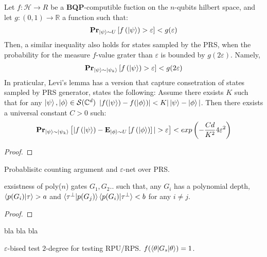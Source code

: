 \documentclass[manuscript,screen,review]{acmart}
\begin{document}
\begin{claim}
  Let $f : \mathcal{H} \rightarrow R$ be a \textbf{BQP}-computible fuction on the $n$-qubits hilbert space, and let $g: (0,1) \rightarrow \mathbb{R} $ a function such that:     
  \begin{equation*}
    \begin{split}
      \prbm{f\left(\ket{\psi} \right) > \varepsilon}{ \ket{\psi} \sim U} < g(\varepsilon)
    \end{split}
  \end{equation*}
  Then, a similar inequality also holds for states sampled by the PRS, when the probability for the measure $f$-value grater than $\varepsilon$ is bounded by $g(2\varepsilon)$. Namely,  
\begin{equation*}
    \begin{split}
      \prbm{f\left(\ket{\psi} \right) > \varepsilon}{ \ket{\psi} \sim \ket{\psi_{k}} } < g(2\varepsilon)
    \end{split}
  \end{equation*}
  In praticular, Levi's lemma has a version that capture consetration of states sampled by PRS generator, states the following: Assume there exsists $K$ such that for any $\ket{\psi},\ket{\phi} \in \mathcal{S}(\mathbb{C}^{d})$ $|f(\ket{\psi}) - f(\ket{\phi})| < K | \ket{\psi} - \ket{\phi}|$. Then there exsists a universal constant $C > 0$ such: 
\begin{equation*}
    \begin{split}
      \prbm{ |f\left(\ket{\psi} \right) - \exppm{f\left(\ket{\phi}\right)}{\ket{\phi} \sim U}| > \varepsilon}{ \ket{\psi} \sim \ket{\psi_{k}} } < exp\left(-\frac{Cd}{K^{2}}  4\varepsilon^{2} \right)
    \end{split}
  \end{equation*}
\end{claim}

\begin{proof}
  
\end{proof}

\begin{claim}
  Probablisitc counting argument and $\varepsilon$-net over PRS. 
\end{claim}

\begin{claim}
  exsistness of poly($n$) gates $G_{1}, G_{2} ..$ such that, any $G_{i}$ has a polynomial depth, $\braket{p(G_{i})|\tau} > a$ and $\braket{\tau^{\perp}|p(G_{j})}\braket{p(G_{i})|\tau^{\perp}} < b$ for any $i\neq j$. 
\end{claim}
\begin{proof}
  
\end{proof}
\begin{claim}
 bla bla bla 
\end{claim}

\begin{definition}
  $\varepsilon$-bised test $2$-degree for testing RPU/RPS. $f(\braket{\theta|G_{s}|\theta}) = 1$. 
\end{definition}


\printbibliography
\end{document}
